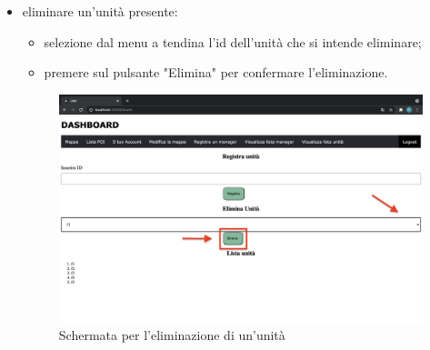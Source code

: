 \begin{itemize}
\begin{figure}[H]
    \end{figure}
    \item eliminare un'unità presente: 
    \begin{itemize}
        \item selezione dal menu a tendina l'id dell'unità che si intende eliminare;
        \item premere sul pulsante "Elimina" per confermare l'eliminazione.
    \end{itemize}
    \begin{figure}[H]
        \centering
        \includegraphics[scale=0.12]{res/images/eliminaunita.png}
        \caption{Schermata per l'eliminazione di un'unità}
    \end{figure}
\end{itemize}
